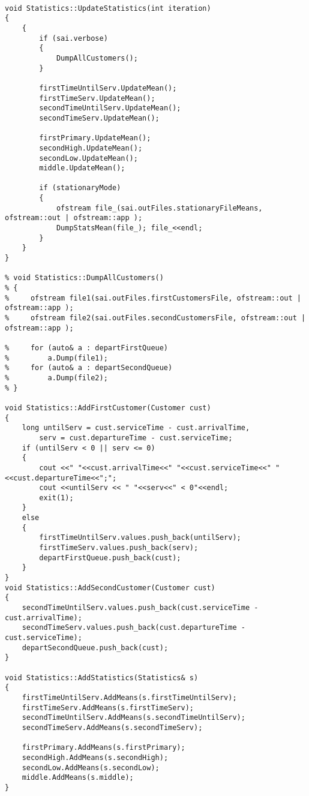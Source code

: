 \begin{lstlisting}[language={[ISO]C++}]
% #include "statistics.h"

void Statistics::UpdateStatistics(int iteration)
{
    {
        if (sai.verbose)
        {
            DumpAllCustomers();
        }

        firstTimeUntilServ.UpdateMean();
        firstTimeServ.UpdateMean();
        secondTimeUntilServ.UpdateMean();
        secondTimeServ.UpdateMean();
      
        firstPrimary.UpdateMean();
        secondHigh.UpdateMean();
        secondLow.UpdateMean();
        middle.UpdateMean();

        if (stationaryMode)
	    {
            ofstream file_(sai.outFiles.stationaryFileMeans, ofstream::out | ofstream::app );
            DumpStatsMean(file_); file_<<endl;
	    }
    }
}

% void Statistics::DumpAllCustomers()
% {
%     ofstream file1(sai.outFiles.firstCustomersFile, ofstream::out | ofstream::app );
%     ofstream file2(sai.outFiles.secondCustomersFile, ofstream::out | ofstream::app );

%     for (auto& a : departFirstQueue)
%         a.Dump(file1);
%     for (auto& a : departSecondQueue)
%         a.Dump(file2);
% }

void Statistics::AddFirstCustomer(Customer cust)
{
    long untilServ = cust.serviceTime - cust.arrivalTime,
        serv = cust.departureTime - cust.serviceTime;
    if (untilServ < 0 || serv <= 0)
    {
        cout <<" "<<cust.arrivalTime<<" "<<cust.serviceTime<<" "<<cust.departureTime<<";";
        cout <<untilServ << " "<<serv<<" < 0"<<endl;
        exit(1);
    }
    else
    {
        firstTimeUntilServ.values.push_back(untilServ);
        firstTimeServ.values.push_back(serv);
        departFirstQueue.push_back(cust);
    }
}
void Statistics::AddSecondCustomer(Customer cust)
{
    secondTimeUntilServ.values.push_back(cust.serviceTime - cust.arrivalTime);
    secondTimeServ.values.push_back(cust.departureTime - cust.serviceTime);
    departSecondQueue.push_back(cust);
}

void Statistics::AddStatistics(Statistics& s)
{
    firstTimeUntilServ.AddMeans(s.firstTimeUntilServ);
    firstTimeServ.AddMeans(s.firstTimeServ);
    secondTimeUntilServ.AddMeans(s.secondTimeUntilServ);
    secondTimeServ.AddMeans(s.secondTimeServ);

    firstPrimary.AddMeans(s.firstPrimary);
    secondHigh.AddMeans(s.secondHigh);
    secondLow.AddMeans(s.secondLow);
    middle.AddMeans(s.middle);
}


\end{lstlisting}
